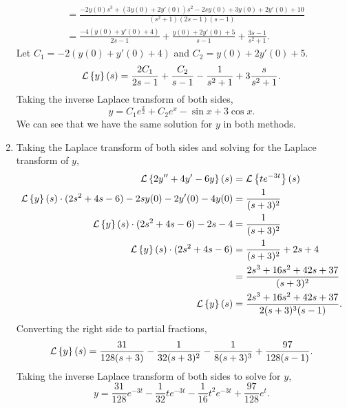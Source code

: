 \begin{enumerate}[label=\arabic*.]
\begin{align*}
			&= \frac{-2y(0)s^3 + (3y(0)+2y'(0))s^2 -2sy(0) + 3y(0) + 2y'(0) + 10}{\left(s^2+1\right)\left(2s-1\right)\left(s-1\right)} \\
			&= \frac{-4(y(0)+y'(0)+4)}{2s-1} + \frac{y(0)+2y'(0)+5}{s-1} + \frac{3s-1}{s^2+1}.
		\end{align*}
		Let $C_1 = -2(y(0)+y'(0)+4)$ and $C_2 = y(0) + 2y'(0) + 5$.
		\begin{equation*}
			\mathcal{L}\left\{ y \right\}\left(s\right) = \frac{2C_1}{2s-1} + \frac{C_2}{s-1} - \frac{1}{s^2+1} + 3\frac{s}{s^2+1}.
		\end{equation*}
		Taking the inverse Laplace transform of both sides,
		\begin{equation*}
			y = C_1e^{\frac{x}{2}} + C_2e^x -\sin{x} + 3\cos{x}.
		\end{equation*}
		We can see that we have the same solution for $y$ in both methods.
	\item
		Taking the Laplace transform of both sides and solving for the Laplace transform of $y$,
		\begin{align*}
			\mathcal{L}\left\{ 2y'' + 4y' - 6y \right\}\left(s\right) &= \mathcal{L}\left\{ te^{-3t} \right\}\left(s\right) \\
			\mathcal{L}\left\{ y \right\}\left(s\right) \cdot (2s^2 + 4s - 6) - 2sy(0) - 2y'(0) - 4y(0) &= \frac{1}{(s+3)^2} \\
			\mathcal{L}\left\{ y \right\}\left(s\right) \cdot (2s^2 + 4s - 6) - 2s - 4 &= \frac{1}{(s+3)^2} \\
			\mathcal{L}\left\{ y \right\}\left(s\right) \cdot (2s^2 + 4s - 6) &= \frac{1}{(s+3)^2} + 2s + 4 \\
			&= \frac{2s^3 + 16s^2 + 42s + 37}{(s+3)^2} \\
			\mathcal{L}\left\{ y \right\}\left(s\right) &= \frac{2s^3 + 16s^2 + 42s + 37}{2(s+3)^3(s-1)}.
		\end{align*}
		Converting the right side to partial fractions,
		\begin{equation*}
			\mathcal{L}\left\{ y \right\}\left(s\right) = \frac{31}{128(s+3)} - \frac{1}{32(s+3)^2} - \frac{1}{8(s+3)^3} + \frac{97}{128(s-1)}.
		\end{equation*}
		Taking the inverse Laplace transform of both sides to solve for $y$,
		\begin{equation*}
			y = \frac{31}{128}e^{-3t} - \frac{1}{32}te^{-3t} - \frac{1}{16}t^2e^{-3t} + \frac{97}{128}e^{t}.
		\end{equation*}
\end{enumerate}